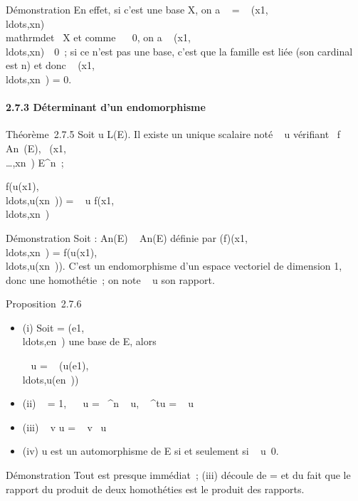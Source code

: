 Démonstration En effet, si c'est une base X, on a
 ~
= ~
(x1,\\ldots,xn)\\mathrm{det}~
X et comme
~
\neq~0, on a
~
(x1,\\ldots,xn)\mathrel\neq~~0~;
si ce n'est pas une base, c'est que la famille est liée (son cardinal
est n) et donc ~
(x1,\\ldots,xn~)
= 0.

\paragraph{2.7.3 Déterminant d'un endomorphisme}

Théorème~2.7.5 Soit u \in L(E). Il existe un unique scalaire noté
~ u vérifiant
\forall~f \in An~(E),
\forall~(x1,\\\ldots,xn~)
\in E^n~;

f(u(x1),\\ldots,u(xn~))
= ~ u
f(x1,\\ldots,xn~)

Démonstration Soit \phiu : An(E) \rightarrow~ An(E)
définie par
\phiu(f)(x1,\\ldots,xn~)
=
f(u(x1),\\ldots,u(xn~)).
C'est un endomorphisme d'un espace vectoriel de dimension 1, donc une
homothétie~; on note
~ u son rapport.

Proposition~2.7.6

\begin{itemize}
\item
  (i) Soit  =
  (e1,\\ldots,en~)
  une base de E, alors

  ~ u
  = ~
  (u(e1),\\ldots,u(en~))
\item
  (ii) ~
  \mathrmId = 1,
  ~ \lambda~u =
  \lambda~^n ~
  u, ~
  ^tu = ~
  u
\item
  (iii) ~ v \cdot u
  = ~
  v~ u
\item
  (iv) u est un automorphisme de E si et seulement si
  ~
  u\neq~0.
\end{itemize}

Démonstration Tout est presque immédiat~; (iii) découle de
\phiv\cdotu = \phiu \cdot \phiv et du fait que le rapport
du produit de deux homothéties est le produit des rapports.

